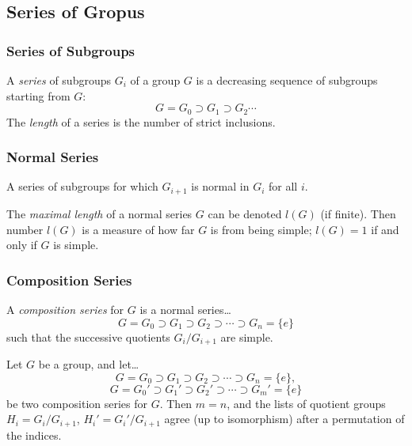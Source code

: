 \subsection{Series of Gropus}

\subsubsection{Series of Subgroups}\label{seriesofsubgroups}
A \emph{series} of subgroups $G_i$ of a group $G$ is a decreasing sequence of subgroups starting from $G$:
$$G = G_0 \supset G_1 \supset G_2 \cdots$$
The \emph{length} of a series is the number of strict inclusions.

\subsubsection{Normal Series}\label{normalseries}
A series of subgroups for which $G_{i+1}$ is normal in $G_i$ for all $i$.

\label{maximallengthofnormalseries}
The \emph{maximal length} of a normal series $G$ can be denoted $l(G)$ (if finite). Then number $l(G)$ is a measure of how far $G$ is from being simple; $l(G) = 1$ if and only if $G$ is simple.

\subsubsection{Composition Series}\label{compositionseries}
A \emph{composition series} for $G$ is a normal series\dots
$$G = G_0 \supset G_1 \supset G_2 \supset \cdots \supset G_n = \{ e \}$$
such that the successive quotients $G_i/G_{i+1}$ are simple.

\begin{theorem}
\label{jordanholder}
Let $G$ be a group, and let\dots
$$G = G_0 \supset G_1 \supset G_2 \supset \cdots \supset G_n = \{ e \},$$
$$G = G_0' \supset G_1' \supset G_2' \supset \cdots \supset G_m' = \{ e \}$$
be two composition series for $G$. Then $m = n$, and the lists of quotient groups $H_i = G_i/G_{i + 1}$, $H_i' = G_i'/G_{i+1}$ agree (up to isomorphism) after a permutation of the indices.
\end{theorem}

